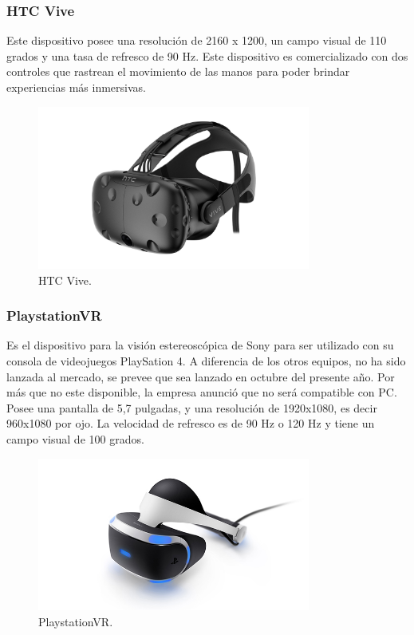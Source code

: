 \documentclass[12pt]{article}
\begin{document}
\subsubsection{HTC Vive}
Este dispositivo posee una resolución de 2160 x 1200, un campo visual de 110 grados y una tasa de refresco de 90 Hz. Este dispositivo es comercializado con dos controles que rastrean el movimiento de las manos para poder brindar experiencias más inmersivas\cite{htcvive}.
\begin{figure}[h!]
\includegraphics[width=0.8\textwidth,center]{htc.png}
\caption{HTC Vive.}
\end{figure}
\subsubsection{PlaystationVR}
Es el dispositivo para la visión estereoscópica de Sony para ser utilizado con su consola de videojuegos PlaySation 4. A diferencia de los otros equipos, no ha sido lanzada al mercado, se prevee que sea lanzado en octubre del presente año. Por más que no este disponible, la empresa anunció que no será compatible con PC.
\\Posee una pantalla de 5,7 pulgadas, y una resolución de 1920x1080, es decir 960x1080 por ojo. La velocidad de refresco es de 90 Hz o 120 Hz y tiene un campo visual de 100 grados\cite{psvrspecs}.
\clearpage
\begin{figure}[h!]
\includegraphics[width=0.8\textwidth,center]{psvr.jpg}
\caption{PlaystationVR.}
\end{figure}
\end{document}
